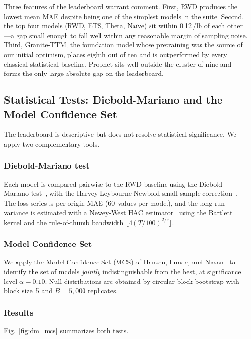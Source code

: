 \documentclass[journal]{IEEEtran}
\begin{document}
Three features of the leaderboard warrant comment.  First, RWD produces
the lowest mean MAE despite being one of the simplest models in the suite.
Second, the top four models (RWD, ETS, Theta, Na\"ive) sit within
0.12\,\textcent/lb of each other---a gap small enough to fall well within
any reasonable margin of sampling noise.  Third, Granite-TTM, the
foundation model whose pretraining was the source of our initial
optimism, places eighth out of ten and is outperformed by every classical
statistical baseline.  Prophet sits well outside the cluster of nine and
forms the only large absolute gap on the leaderboard.

\subsection{Statistical Tests: Diebold-Mariano and the Model Confidence Set}
\label{sec:dm_mcs}

The leaderboard is descriptive but does not resolve statistical
significance.  We apply two complementary tools.

\subsubsection{Diebold-Mariano test}
Each model is compared pairwise to the RWD baseline using the
Diebold-Mariano test~\cite{dieboldmariano1995}, with the
Harvey-Leybourne-Newbold small-sample correction~\cite{harveyleybournenewbold1997}.
The loss series is per-origin MAE (60~values per model), and the long-run
variance is estimated with a Newey-West HAC
estimator~\cite{neweywest1994} using the Bartlett kernel and the rule-of-thumb
bandwidth $\lfloor 4(T/100)^{2/9} \rfloor$.

\subsubsection{Model Confidence Set}
We apply the Model Confidence Set (MCS) of Hansen, Lunde, and
Nason~\cite{hansenlundenason2011} to identify the set of models
\emph{jointly} indistinguishable from the best, at significance level
$\alpha=0.10$.  Null distributions are obtained by circular block
bootstrap with block size~5 and $B = 5{,}000$ replicates.

\subsubsection{Results}
Fig.~\ref{fig:dm_mcs} summarizes both tests.
\end{document}
